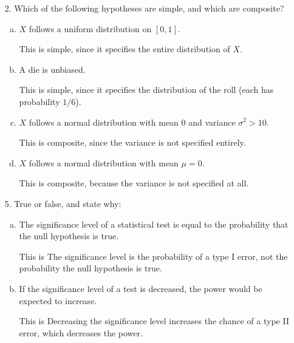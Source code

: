 \documentclass{article}
\begin{document}
\begin{itemize}
	\item[2.] Which of the following hypotheses are simple, and which are composite?

		\begin{enumerate}[a.]
			\item $X$ follows a uniform distribution on $[0, 1].$
				\begin{answer*}
					This is simple, since it specifies the entire distribution of $X.$
				\end{answer*}

			\item A die is unbiased.
				\begin{answer*}
					This is simple, since it specifies the distribution of the roll (each has probability $1/6$).
				\end{answer*}

			\item $X$ follows a normal distribution with mean 0 and variance $\sigma^2>10.$
				\begin{answer*}
					This is composite, since the variance is not specified entirely.
				\end{answer*}

			\item $X$ follows a normal distribution with mean $\mu=0.$
				\begin{answer*}
					This is composite, because the variance is not specified at all.
				\end{answer*}
				
		\end{enumerate}

	\item[5.] True or false, and state why:

		\begin{enumerate}[a.]
			\item The significance level of a statistical test is equal to the probability that the null hypothesis is true.
				\begin{answer*}
					This is  The significance level is the probability of a type I error, not the probability the null hypothesis is true.
				\end{answer*}

			\item If the significance level of a test is decreased, the power would be expected to increase.
				\begin{answer*}
					This is  Decreasing the significance level increases the chance of a type II error, which decreases the power.
				\end{answer*}


\end{enumerate}
\end{itemize}
\end{document}

